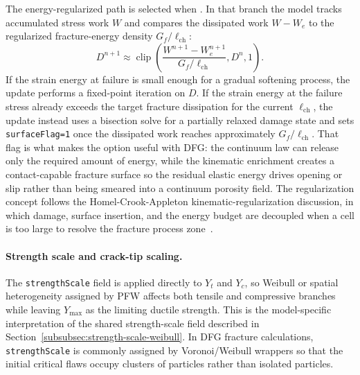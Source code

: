 The energy-regularized path is selected when .  In that branch the model tracks accumulated stress work \(W\) and compares the dissipated work \(W-W_e\) to the regularized fracture-energy density \(G_f/\ell_{\mathrm{ch}}\):
\begin{equation}
  D^{n+1}\approx
  \operatorname{clip}\left(\frac{W^{n+1}-W_e^{n+1}}{G_f/\ell_{\mathrm{ch}}},D^n,1\right).
  \label{eq:ceramic-energy-damage}
\end{equation}
If the strain energy at failure is small enough for a gradual softening process, the update performs a fixed-point iteration on \(D\).  If the strain energy at the failure stress already exceeds the target fracture dissipation for the current \(\ell_{\mathrm{ch}}\), the update instead uses a bisection solve for a partially relaxed damage state and sets \texttt{surfaceFlag=1} once the dissipated work reaches approximately \(G_f/\ell_{\mathrm{ch}}\).  That flag is what makes the option useful with DFG: the continuum law can release only the required amount of energy, while the kinematic enrichment creates a contact-capable fracture surface so the residual elastic energy drives opening or slip rather than being smeared into a continuum porosity field.  The regularization concept follows the Homel-Crook-Appleton kinematic-regularization discussion, in which damage, surface insertion, and the energy budget are decoupled when a cell is too large to resolve the fracture process zone~\cite{homelCrookAppleton2026sizeeffects}.

\paragraph{Strength scale and crack-tip scaling.}
The \texttt{strengthScale} field is applied directly to \(Y_t\) and \(Y_c\), so Weibull or spatial heterogeneity assigned by PFW affects both tensile and compressive branches while leaving \(Y_{\max}\) as the limiting ductile strength.  This is the model-specific interpretation of the shared strength-scale field described in Section~\ref{subsubsec:strength-scale-weibull}.  In DFG fracture calculations, \texttt{strengthScale} is commonly assigned by Voronoi/Weibull wrappers so that the initial critical flaws occupy clusters of particles rather than isolated particles.

